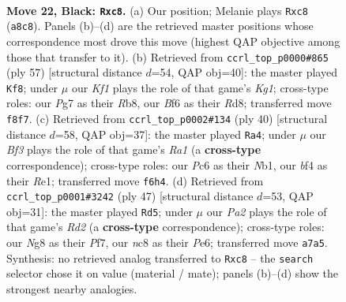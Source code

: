 \documentclass[11pt]{article}
\begin{document}
\clearpage

\begin{figure}[p]\centering
\begin{subfigure}{0.46\textwidth}\centering
\resizebox{\linewidth}{!}{%
\newchessgame
\chessboard[
  setfen={r1N2knr/p5pp/2p2b2/5p2/5B2/3B1P1P/PPP3P1/R2R2K1 b - - 0 22},
  showmover=false,
  pgfstyle=straightmove, color=movearrow, markmove={a8-c8}
]}
\caption{}
\end{subfigure}\hfill
\begin{subfigure}{0.46\textwidth}\centering
\resizebox{\linewidth}{!}{%
\newchessgame
\chessboard[
  setfen={1r1rb1k1/5p2/2p1p2p/p1N3p1/1nBP4/5P2/PP4PP/2RR2K1 b - - 5 29},
  showmover=false,
  pgfstyle=straightmove, color=movearrow, markmove={g8-f8}
]}
\caption{}
\end{subfigure}
\\[4pt]
\begin{subfigure}{0.46\textwidth}\centering
\resizebox{\linewidth}{!}{%
\newchessgame
\chessboard[
  setfen={r4r2/ppp2kpp/3p1b2/1P1n4/5P2/6P1/1PPB2KP/RN2R3 w - - 3 21},
  showmover=false,
  pgfstyle=straightmove, color=movearrow, markmove={a1-a4}
]}
\caption{}
\end{subfigure}\hfill
\begin{subfigure}{0.46\textwidth}\centering
\resizebox{\linewidth}{!}{%
\newchessgame
\chessboard[
  setfen={r5k1/3r1pb1/4p1pp/p1P5/5B1P/2P3P1/P4P2/R3R1K1 b - - 0 24},
  showmover=false,
  pgfstyle=straightmove, color=movearrow, markmove={d7-d5}
]}
\caption{}
\end{subfigure}
\caption{\textbf{Move 22, Black: \texttt{Rxc8}.} (a) Our position; Melanie plays \texttt{Rxc8} (\texttt{a8c8}). Panels (b)--(d) are the retrieved master positions whose correspondence most drove this move (highest QAP objective among those that transfer to it). (b) Retrieved from \texttt{ccrl\_top\_p0000\#865} (ply 57) [structural distance $d$=54, QAP obj=40]: the master played \texttt{Kf8}; under $\mu$ our \emph{Kf1} plays the role of that game's \emph{Kg1}; cross-type roles: our \emph{P}g7 as their \emph{R}b8, our \emph{B}f6 as their \emph{R}d8; transferred move \texttt{f8f7}. (c) Retrieved from \texttt{ccrl\_top\_p0002\#134} (ply 40) [structural distance $d$=58, QAP obj=37]: the master played \texttt{Ra4}; under $\mu$ our \emph{Bf3} plays the role of that game's \emph{Ra1} (a \textbf{cross-type} correspondence); cross-type roles: our \emph{P}c6 as their \emph{N}b1, our \emph{b}f4 as their \emph{R}e1; transferred move \texttt{f6h4}. (d) Retrieved from \texttt{ccrl\_top\_p0001\#3242} (ply 47) [structural distance $d$=53, QAP obj=31]: the master played \texttt{Rd5}; under $\mu$ our \emph{Pa2} plays the role of that game's \emph{Rd2} (a \textbf{cross-type} correspondence); cross-type roles: our \emph{N}g8 as their \emph{P}f7, our \emph{n}c8 as their \emph{P}e6; transferred move \texttt{a7a5}. Synthesis: no retrieved analog transferred to \texttt{Rxc8} -- the \texttt{search} selector chose it on value (material / mate); panels (b)--(d) show the strongest nearby analogies.}
\label{fig:thought-m43}
\end{figure}
\end{document}
